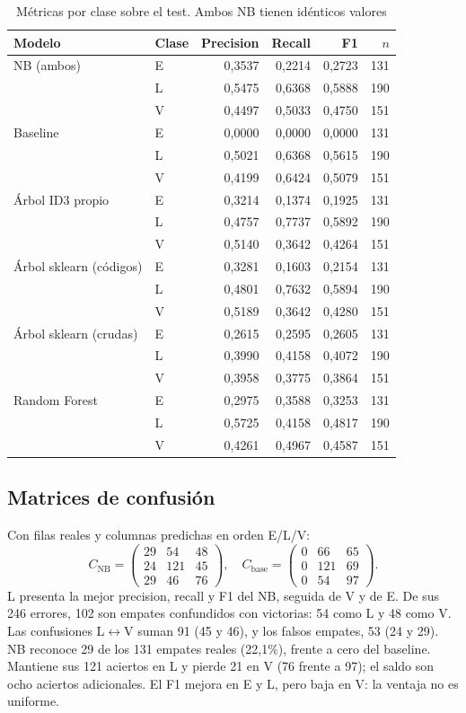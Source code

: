 \documentclass[conference]{IEEEtran}
\begin{document}
\begin{table}[htbp]
\caption{Métricas por clase sobre el test. Ambos NB tienen idénticos valores}
\label{tab:clases}
\centering
\begin{tabular}{llrrrr}
\hline
Modelo & Clase & Precision & Recall & F1 & $n$ \\
\hline
NB (ambos) & E & 0,3537 & 0,2214 & 0,2723 & 131 \\
 & L & 0,5475 & 0,6368 & 0,5888 & 190 \\
 & V & 0,4497 & 0,5033 & 0,4750 & 151 \\
Baseline & E & 0,0000 & 0,0000 & 0,0000 & 131 \\
 & L & 0,5021 & 0,6368 & 0,5615 & 190 \\
 & V & 0,4199 & 0,6424 & 0,5079 & 151 \\
Árbol ID3 propio & E & 0,3214 & 0,1374 & 0,1925 & 131 \\
 & L & 0,4757 & 0,7737 & 0,5892 & 190 \\
 & V & 0,5140 & 0,3642 & 0,4264 & 151 \\
Árbol sklearn (códigos) & E & 0,3281 & 0,1603 & 0,2154 & 131 \\
 & L & 0,4801 & 0,7632 & 0,5894 & 190 \\
 & V & 0,5189 & 0,3642 & 0,4280 & 151 \\
Árbol sklearn (crudas) & E & 0,2615 & 0,2595 & 0,2605 & 131 \\
 & L & 0,3990 & 0,4158 & 0,4072 & 190 \\
 & V & 0,3958 & 0,3775 & 0,3864 & 151 \\
Random Forest & E & 0,2975 & 0,3588 & 0,3253 & 131 \\
 & L & 0,5725 & 0,4158 & 0,4817 & 190 \\
 & V & 0,4261 & 0,4967 & 0,4587 & 151 \\
\hline
\end{tabular}
\end{table}

\subsection{Matrices de confusión}
Con filas reales y columnas predichas en orden E/L/V:
\[
C_{\mathrm{NB}}=
\begin{pmatrix}29&54&48\\24&121&45\\29&46&76\end{pmatrix},
\quad
C_{\mathrm{base}}=
\begin{pmatrix}0&66&65\\0&121&69\\0&54&97\end{pmatrix}.
\]
L presenta la mejor precision, recall y F1 del NB, seguida de V y de E. De sus 246 errores, 102 son empates confundidos con victorias: 54 como L y 48 como V. Las confusiones L$\leftrightarrow$V suman 91 (45 y 46), y los falsos empates, 53 (24 y 29). NB reconoce 29 de los 131 empates reales (22,1\%), frente a cero del baseline. Mantiene sus 121 aciertos en L y pierde 21 en V (76 frente a 97); el saldo son ocho aciertos adicionales. El F1 mejora en E y L, pero baja en V: la ventaja no es uniforme.
\end{document}
